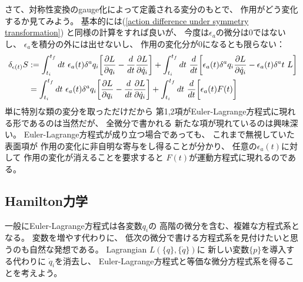 さて、対称性変換のgauge化によって定義される変分のもとで、
作用がどう変化するか見てみよう。
基本的には(\ref{action difference under symmetry transformation})
と同様の計算をすれば良いが、
今度は$\epsilon_a$の微分は$0$ではないし、
$\epsilon_a$を積分の外には出せないし、
作用の変化分が$0$になるとも限らない：
\begin{align}
  \delta_{\epsilon(t)} S
  &:=
  \int_{t_i}^{t_f} dt
  \ 
  \epsilon_a(t)
  \delta^a q_i
  \bigg[
    \dfrac{\partial L}{\partial q_i}
  -
  \dfrac{d}{dt}
    \dfrac{\partial L}{\partial \dot{q}_i}
  \bigg]
  +
  \int_{t_i}^{t_f} dt
  \ 
  \dfrac{d}{dt}
  \bigg[
    \epsilon_a(t)
    \delta^a q_i
    \dfrac{\partial L}{\partial \dot{q}_i}
  -
    \epsilon_a(t)
    \delta^a t
    \ 
    L
  \bigg]
\notag\\&=
  \int_{t_i}^{t_f} dt
  \ 
  \epsilon_a(t)
  \delta^a q_i
  \bigg[
    \dfrac{\partial L}{\partial q_i}
  -
  \dfrac{d}{dt}
    \dfrac{\partial L}{\partial \dot{q}_i}
  \bigg]
  +
  \int_{t_i}^{t_f} dt
  \ 
  \dfrac{d}{dt}
  \bigg[
    \epsilon_a(t)
    F(t)
  \bigg]
\end{align}
単に特別な類の変分を取っただけだから
第1,2項がEuler-Lagrange方程式に現れる形であるのは当然だが、
全微分で書かれる
新たな項が現れているのは興味深い。
Euler-Lagrange方程式が成り立つ場合であっても、
これまで無視していた表面項が
作用の変化に非自明な寄与をし得ることが分かり、
任意の$\epsilon_a (t)$に対して
作用の変化が消えることを要求すると
$F(t)$が運動方程式に現れるのである。

\subsection{Hamilton力学}

一般にEuler-Lagrange方程式は各変数$q_i$の
高階の微分を含む、複雑な方程式系となる。
変数を増やす代わりに、
低次の微分で書ける方程式系を見付けたいと思うのも自然な発想である。
Lagrangian $L(\{q\},\{\dot{q}\})$に
新しい変数$\{p\}$を導入する代わりに
$\dot{q}_i$を消去し、
Euler-Lagrange方程式と等価な微分方程式系を得ることを考えよう。

